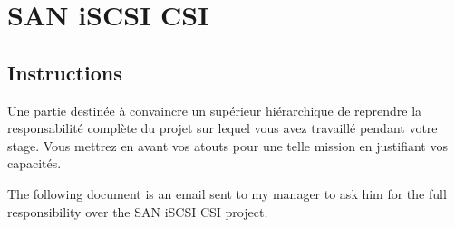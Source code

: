 \chapter{SAN iSCSI CSI}

\section{Instructions}

\color{red}
Une partie destinée à convaincre un supérieur hiérarchique de reprendre la responsabilité complète du projet sur lequel vous avez travaillé pendant votre stage. Vous mettrez en avant vos atouts pour une telle mission en justifiant vos capacités.
\color{black}

The following document is an email sent to my manager to ask him for the full responsibility over the SAN iSCSI CSI project.

\clearpage


\clearpage
